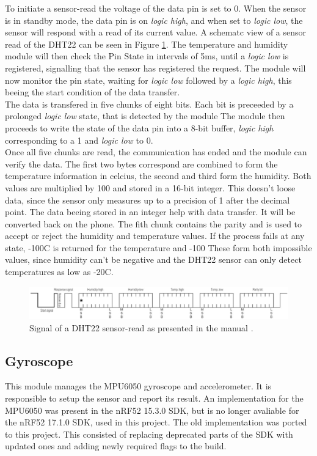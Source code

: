 To initiate a sensor-read the voltage of the data pin is set to 0.
When the sensor is in standby mode, the data pin is on \textit{logic high}, and when set to \textit{logic low}, the sensor will respond with a read of its current value.
A schematc view of a sensor read of the DHT22 can be seen in Figure \ref{f:dht22_signal}.
The temperature and humidity module will then check the Pin State in intervals of 5ms, until a \textit{logic low} is registered, signalling that the sensor has registered the request. 
The module will now monitor the pin state, waiting for \textit{logic low} followed by a \textit{logic high}, this beeing the start condition of the data transfer. \\
The data is transfered in five chunks of eight bits.
Each bit is preceeded by a prolonged \textit{logic low} state, that is detected by the module
The module then proceeds to write the state of the data pin into a 8-bit buffer, \textit{logic high} corresponding to a 1 and \textit{logic low} to 0.\\
Once all five chunks are read, the communication has ended and the module can verify the data.
The first two bytes correspond are combined to form the temperature information in celcius, the second and third form the humidity.
Both values are multiplied by 100 and stored in a 16-bit integer. This doesn't loose data, since the sensor only measures up to a precision of 1 after the decimal point.
The data beeing stored in an integer help with data transfer.
It will be converted back on the phone.
The fith chunk contains the parity and is used to accept or reject the humidity and temperature values.
If the process fails at any state, -100\degree C is returned for the temperature and -100%
These form both impossible values, since humidity can't be negative and the DHT22 sensor can only detect temperatures as low as -20\degree C.


\begin{figure}[ht!]
\centering
\includegraphics[width=\linewidth]{graphics/DHT22_signal.png}
\caption{Signal of a DHT22 sensor-read as presented in the manual \cite{AM2302}.}
\label{f:dht22_signal}
\end{figure}

\subsection{Gyroscope}
\label{ss:gyro_module}
This module manages the MPU6050 gyroscope and accelerometer.
It is responsible to setup the sensor and report its result.
An implementation for the MPU6050 was present in the nRF52 15.3.0 SDK, but is no longer avaliable for the nRF52 17.1.0 SDK, used in this project.
The old implementation was ported to this project.
This consisted of replacing deprecated parts of the SDK with updated ones and adding newly required flags to the build.


